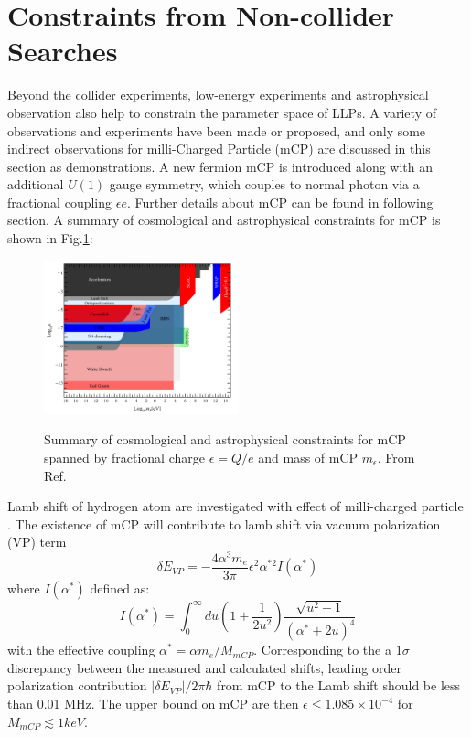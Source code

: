 \section{Constraints from Non-collider Searches}

Beyond the collider experiments, low-energy experiments and astrophysical observation also help to constrain the parameter space of LLPs. A variety of observations and experiments have been made or proposed, and only some indirect observations for milli-Charged Particle (mCP) are discussed in this section as demonstrations. A new fermion mCP is introduced along with an additional $U(1)$ gauge symmetry, which couples to normal photon via a fractional coupling $\epsilon e$. Further details about mCP can be found in following section. A summary of cosmological and astrophysical constraints for mCP is shown in Fig.\ref{fig:mCPnoncollider}:
\begin{figure}[!h]
    \centering
    \caption{Summary of cosmological and astrophysical constraints for mCP spanned by fractional charge $\epsilon = Q/e$ and mass of mCP $m_\epsilon$. From Ref.\cite{mCPnoncollider}}
    \includegraphics[width=0.5\textwidth]{fig/noncolliderMCP.png}
    \label{fig:mCPnoncollider}
\end{figure}
Lamb shift of hydrogen atom are investigated with effect of milli-charged particle \cite{mCPlambshift}. The existence of mCP will contribute to lamb shift via vacuum polarization (VP) term
\begin{equation}
    \delta E_{VP} = -\frac{4\alpha^3 m_e}{3\pi}\epsilon^2 \alpha^{\ast 2}I(\alpha^{\ast})
\end{equation}
where $I(\alpha^{\ast})$ defined as:
\begin{equation}
    I(\alpha^{\ast}) = \int^{\infty}_{0}du(1+\frac{1}{2u^2})\frac{\sqrt{u^2-1}}{(\alpha^{\ast}+2u)^4}
\end{equation}
with the effective coupling $\alpha^{\ast} = \alpha m_e/M_{mCP}$. Corresponding to the a $1\sigma$ discrepancy between the measured and calculated shifts, leading order polarization contribution $|\delta E_{VP}|/2\pi\hbar$ from mCP to the Lamb shift should be less than 0.01 MHz. The upper bound on mCP are then $\epsilon \leq 1.085\times10^{-4}$ for $M_{mCP} \lesssim 1 keV$.


